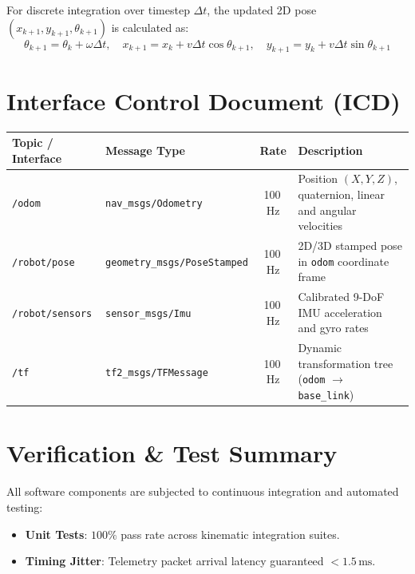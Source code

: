 \documentclass[11pt,a4paper]{article}
\begin{document}
For discrete integration over timestep $\Delta t$, the updated 2D pose $(x_{k+1}, y_{k+1}, \theta_{k+1})$ is calculated as:
\begin{equation}
\theta_{k+1} = \theta_k + \omega \Delta t, \quad x_{k+1} = x_k + v \Delta t \cos\theta_{k+1}, \quad y_{k+1} = y_k + v \Delta t \sin\theta_{k+1}
\end{equation}

\section{Interface Control Document (ICD)}
\begin{center}
\footnotesize
\renewcommand{\arraystretch}{1.15}
\begin{tabularx}{\textwidth}{@{} l l c Y @{}}
\toprule
\textbf{Topic / Interface} & \textbf{Message Type} & \textbf{Rate} & \textbf{Description} \\
\midrule
\texttt{/odom} & \texttt{nav\_msgs/Odometry} & 100\,Hz & Position $(X,Y,Z)$, quaternion, linear and angular velocities \\
\texttt{/robot/pose} & \texttt{geometry\_msgs/PoseStamped} & 100\,Hz & 2D/3D stamped pose in \texttt{odom} coordinate frame \\
\texttt{/robot/sensors} & \texttt{sensor\_msgs/Imu} & 100\,Hz & Calibrated 9-DoF IMU acceleration and gyro rates \\
\texttt{/tf} & \texttt{tf2\_msgs/TFMessage} & 100\,Hz & Dynamic transformation tree (\texttt{odom} $\to$ \texttt{base\_link}) \\
\bottomrule
\end{tabularx}
\vspace{-4pt}
\end{center}

\section{Verification \& Test Summary}
All software components are subjected to continuous integration and automated testing:
\begin{itemize}
    \item \textbf{Unit Tests}: $100\%$ pass rate across kinematic integration suites.
    \item \textbf{Timing Jitter}: Telemetry packet arrival latency guaranteed $< 1.5\,\text{ms}$.
\end{itemize}
\end{document}
